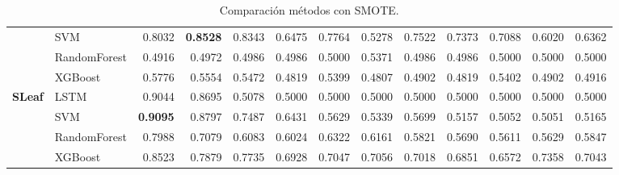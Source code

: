 \begin{table}[h]
\begin{adjustbox}{max width=15cm}
\begin{tabular}{|c|l|r|r|r|r|r|r|r|r|r|r|r|}
	& SVM &  0.8032 &  \textbf{0.8528} &  0.8343 &  0.6475 &  0.7764 &  0.5278 &  0.7522 &  0.7373 &  0.7088 &  0.6020 &  0.6362 \\
	& RandomForest &  0.4916 &  0.4972 &  0.4986 &  0.4986 &  0.5000 &  0.5371 &  0.4986 &  0.4986 &  0.5000 &  0.5000 &  0.5000 \\
	& XGBoost &  0.5776 &  0.5554 &  0.5472 &  0.4819 &  0.5399 &  0.4807 &  0.4902 &  0.4819 &  0.5402 &  0.4902 &  0.4916 \\
	\hline
	\textbf{SLeaf} & LSTM &  0.9044 &  0.8695 &  0.5078 &  0.5000 &  0.5000 &  0.5000 &  0.5000 &  0.5000 &  0.5000 &  0.5000 &  0.5000 \\
	& SVM &  \textbf{0.9095} &  0.8797 &  0.7487 &  0.6431 &  0.5629 &  0.5339 &  0.5699 &  0.5157 &  0.5052 &  0.5051 &  0.5165 \\
	& RandomForest &  0.7988 &  0.7079 &  0.6083 &  0.6024 &  0.6322 &  0.6161 &  0.5821 &  0.5690 &  0.5611 &  0.5629 &  0.5847 \\
	& XGBoost &  0.8523 &  0.7879 &  0.7735 &  0.6928 &  0.7047 &  0.7056 &  0.7018 &  0.6851 &  0.6572 &  0.7358 &  0.7043 \\
	\hline
\end{tabular}
\end{adjustbox}
\caption{Comparación métodos con SMOTE.}
\label{tab:all_comp_smote}
\end{table}
\newpage
